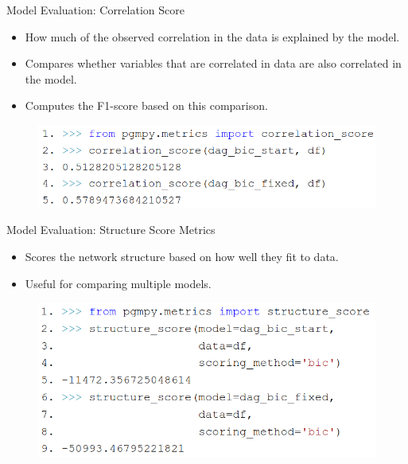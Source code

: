 \documentclass[aspectratio=169]{beamer}
\begin{document}
\begin{frame}{Model Evaluation: Correlation Score}
	\begin{itemize}
		\item How much of the observed correlation in the data is explained by the model.
		\item Compares whether variables that are correlated in data
			are also correlated in the model.
		\item Computes the F1-score based on this comparison.
	\end{itemize}
	\vspace{2em}
	\begin{figure}
		\centering
		\includegraphics[scale=0.3]{imgs/corr_score.png}
	\end{figure}

\end{frame}


\begin{frame}{Model Evaluation: Structure Score Metrics}
	\begin{itemize}
		\item Scores the network structure based on how well they fit to data.
		\item Useful for comparing multiple models.
	\end{itemize}
	\vspace{1em}
	\begin{figure}
		\includegraphics[scale=0.3]{imgs/structure_score.png}
	\end{figure}
\end{frame}
\end{document}
